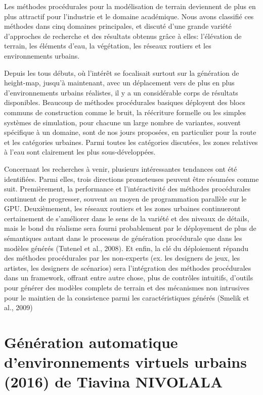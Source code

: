 \documentclass[11pt]{report}
\begin{document}
Les méthodes procédurales pour la modélisation de terrain deviennent de plus en plus attractif pour l'industrie et le domaine académique. Nous avons classifié ces méthodes dans cinq domaines principales, et discuté d'une grande variété d'approches de recherche et des résultats obtenus grâce à elles: l'élévation de terrain, les éléments d'eau, la végétation, les réseaux routiers et les environnements urbains. \newline

Depuis les tous débuts, où l'intérêt se focalisait surtout sur la génération de height-map, jusqu'à maintenant, avec un déplacement vers de plus en plus d'environnements urbains réalistes, il y a un considérable corps de résultats disponibles. Beaucoup de méthodes procédurales basiques déployent des blocs communs de construction comme le bruit, la réécriture formelle ou les simples systèmes de simulation, pour chacune un large nombre de variantes, souvent spécifique à un domaine, sont de nos jours proposées, en particulier pour la route et les catégories urbaines. Parmi toutes les catégories discutées, les zones relatives à l'eau sont clairement les plus sous-développées.\newline

Concernant les recherches à venir, plusieurs intéressantes tendances ont été identifiées. Parmi elles, trois directions prometeuses peuvent être résumées comme suit. Premièrement, la performance et l'intéractivité des méthodes procédurales continuent de progresser, souvent au moyen de programmation parallèle sur le GPU. Deuxièmement, les réseaux routiers et les zones urbaines continueront certainement de s'améliorer dans le sens de la variété et des niveaux de détails, mais le bond du réalisme sera fourni probablement par le déployement de plus de sémantiques autant dans le processus de génération procédurale que dans les modèles générés (Tutenel et al., 2008). Et enfin, la clé du déploiement répandu des méthodes procédurales par les non-experts (ex. les designers de jeux, les artistes, les designers de scénarios) sera l'intégration des méthodes procédurales dans un framework, offrant entre autre chose, plus de contrôles intuitifs, d'outils pour générer des modèles complets de terrain et des mécanismes non intrusives pour le maintien de la consistence parmi les caractéristiques générés  (Smelik et al., 2009)

\part{Génération automatique d’environnements virtuels urbains (2016) de Tiavina NIVOLALA}
\end{document}
